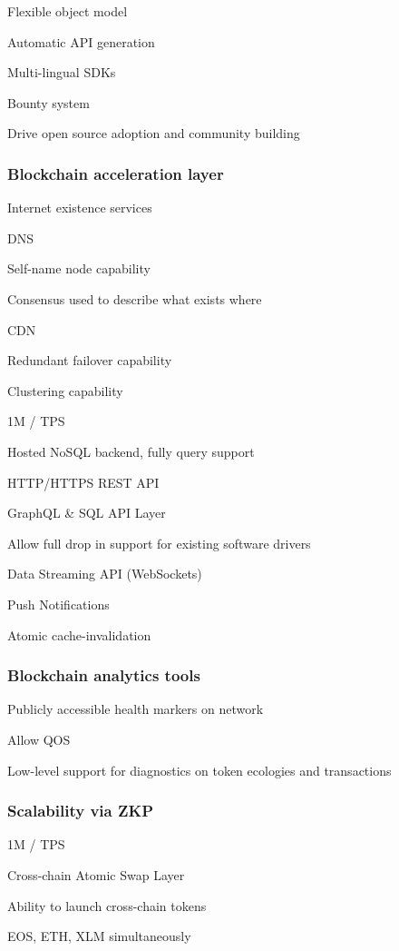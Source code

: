 \documentclass[11pt]{article}
\begin{document}
Flexible object model


Automatic API generation


Multi-lingual SDKs


Bounty system


Drive open source adoption and community building


\subsubsection{Blockchain acceleration layer}

Internet existence services


DNS


Self-name node capability


Consensus used to describe what exists where


CDN


Redundant failover capability


Clustering capability


1M / TPS


Hosted NoSQL backend, fully query support


HTTP/HTTPS REST API


GraphQL \& SQL API Layer


Allow full drop in support for existing software drivers


Data Streaming API (WebSockets)


Push Notifications


Atomic cache-invalidation


\subsubsection{Blockchain analytics tools}

Publicly accessible health markers on network


Allow QOS


Low-level support for diagnostics on token ecologies and transactions


\subsubsection{Scalability via ZKP}

1M / TPS


Cross-chain Atomic Swap Layer


Ability to launch cross-chain tokens


EOS, ETH, XLM simultaneously
\end{document}
